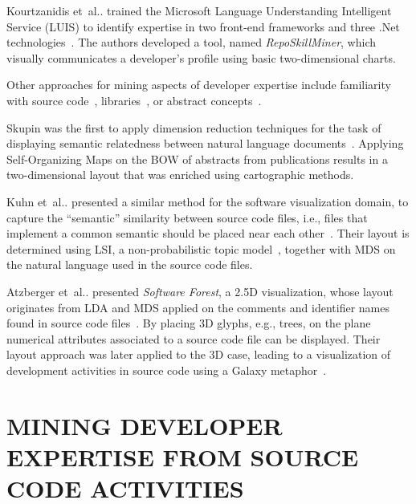 \documentclass[a4paper,twoside]{article}
\makeatletter
\DeclareRobustCommand\onedot{\futurelet\@let@token\@onedot}
\def\@onedot{\ifx\@let@token.\else.\null\fi\xspace}
\def\etal{et~al\onedot\xspace}
\def\ie{i.e.,\xspace}
\def\eg{e.g.,\xspace}
\makeatother
\begin{document}
Kourtzanidis \etal trained the Microsoft Language Understanding Intelligent Service (LUIS) to identify expertise in two front-end frameworks and three .Net technologies~\cite{kourtzanidis2020reposkillminer}.
The authors developed a tool, named \textit{RepoSkillMiner}, which visually communicates a developer's profile using basic two-dimensional charts.

Other approaches for mining aspects of developer expertise include familiarity with source code~\cite{Fritz2014Degree}, libraries~\cite{Teyton2013Library}, or abstract concepts~\cite{teyton2014expertise}.

Skupin was the first to apply dimension reduction techniques for the task of displaying semantic relatedness between natural language documents~\cite{skupin2004worldofgeography}.
Applying Self-Organizing Maps on the \ac{BOW} of abstracts from publications results in a two-dimensional layout that was enriched using cartographic methods.

Kuhn \etal presented a similar method for the software visualization domain, to capture the \enquote{semantic} similarity between source code files, \ie files that implement a common semantic should be placed near each other~\cite{kuhn2008consistentlayout,kuhn2010software}.
Their layout is determined using \ac{LSI}, a non-probabilistic topic model~\cite{deerwester1990indexing}, together with \ac{MDS} on the natural language used in the source code files.

Atzberger \etal presented \textit{Software Forest}, a 2.5D visualization, whose layout originates from \ac{LDA} and \ac{MDS} applied on the comments and identifier names found in source code files~\cite{atzberger2021softwareforest}.
By placing 3D glyphs, \eg trees, on the plane numerical attributes associated to a source code file can be displayed.
Their layout approach was later applied to the 3D case, leading to a visualization of development activities in source code using a Galaxy metaphor~\cite{atzberger2021-softwaregalaxy}.

\section{\uppercase{Mining Developer Expertise from Source Code Activities}}
\label{KM:Sec:ConceptExpertise}
\end{document}
